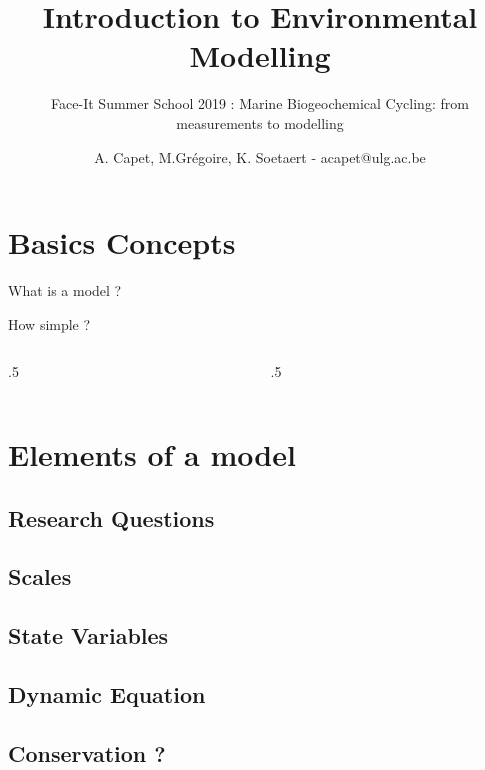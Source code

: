 \documentclass[final,xcolor=dvipsnames]{beamer}
\title[Introduction to Environmental Modelling]{Introduction to Environmental Modelling}
\subtitle{Face-It Summer School 2019 : Marine Biogeochemical Cycling: from measurements to modelling}
\author[A. Capet]{A. Capet, M.Grégoire, K. Soetaert - acapet@ulg.ac.be} %
\institute[http://labos.ulg.ac.be/mast/]{MAST}
\date[Oct 2019]
\begin{document}

\begin{frame}
  \titlepage
\end{frame}


\section{Basics Concepts}
\begin{frame}{What is a model ?}
\end{frame}

\begin{frame}{How simple ?}
\begin{columns}
\begin{column}{.5\framewidth}
\end{column}
\begin{column}{.5\framewidth}
\end{column}
\end{columns}
\end{frame}


\section{Elements of a model}
\subsection{Research Questions}
\subsection{Scales}
\subsection{State Variables}
\subsection{Dynamic Equation}
\subsection{Conservation ?}
\end{document}
